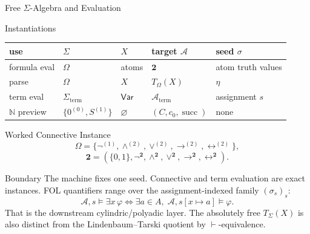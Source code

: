 \documentclass[12pt, a4paper]{report}
\begin{document}
\begin{modelbox}{Free \(\Sigma\)-Algebra and Evaluation}
\begin{modelconsequences}
  \modelconsequence{\[
    \operatorname{eval}(\mathcal A)(\sigma):=\widehat\sigma.
  \]}
\end{modelconsequences}

\begin{modelcomponent}{Instantiations}
\begin{center}
\begin{tabularx}{\linewidth}{@{}lXXXX@{}}
\toprule
use & \(\Sigma\) & \(X\) & target \(\mathcal A\) & seed \(\sigma\) \\
\midrule
formula eval &
\(\Omega\) &
atoms &
\(\mathbf 2\) &
atom truth values \\
parse &
\(\Omega\) &
\(X\) &
\(T_{\Omega}(X)\) &
\(\eta\) \\
term eval &
\(\Sigma_{\mathrm{term}}\) &
\(\mathsf{Var}\) &
\(\mathcal A_{\mathrm{term}}\) &
assignment \(s\) \\
\(\mathbb N\) preview &
\(\{0^{(0)},S^{(1)}\}\) &
\(\varnothing\) &
\((C,c_0,\operatorname{succ})\) &
none \\
\bottomrule
\end{tabularx}
\end{center}
\end{modelcomponent}

\begin{modelcomponent}{Worked Connective Instance}
\[
  \Omega=\{\neg^{(1)},\wedge^{(2)},\vee^{(2)},\to^{(2)},\leftrightarrow^{(2)}\},
\]
\[
  \mathbf 2=(\{0,1\},\neg^{\mathbf 2},\wedge^{\mathbf 2},
  \vee^{\mathbf 2},\to^{\mathbf 2},\leftrightarrow^{\mathbf 2}).
\]
\end{modelcomponent}

\begin{modelcomponent}{Boundary}
The machine fixes one seed. Connective and term evaluation are exact
instances. FOL quantifiers range over the assignment-indexed family
\((\sigma_s)_s\):
\[
  \mathcal A,s\models\exists x\,\varphi
  \Longleftrightarrow
  \exists a\in A,\;\mathcal A,s[x\mapsto a]\models\varphi.
\]
That is the downstream cylindric/polyadic layer. The absolutely free
\(T_{\Sigma}(X)\) is also distinct from the Lindenbaum--Tarski quotient by
\(\vdash\)-equivalence.
\end{modelcomponent}
\end{modelbox}
\end{document}
